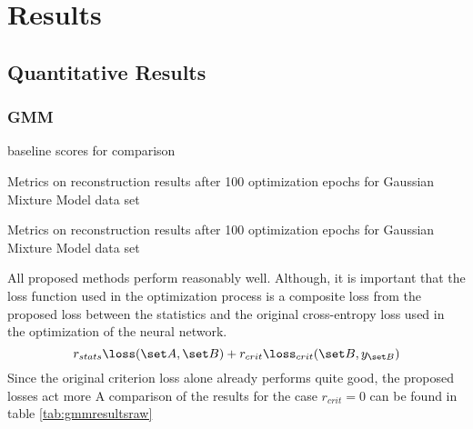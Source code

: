 \section{Results}

\subsection{Quantitative Results}

\subsubsection{GMM}

\begin{table}
\centering
\footnotesize
{}
\caption{baseline scores for comparison}
\label{tab:gmmbaseline}
\end{table}

\begin{table}
\centering
\footnotesize
{}
\caption{Metrics on reconstruction results after 100 optimization epochs for Gaussian Mixture Model data set}
\label{tab:gmmresults}
\end{table}

\begin{table}
\centering
\footnotesize
{}
\caption{Metrics on reconstruction results after 100 optimization epochs for Gaussian Mixture Model data set}
\label{tab:gmmresultsraw}
\end{table}

All proposed methods perform reasonably well. 
Although, it is important that the loss function used in the optimization process
is a composite loss from the proposed loss between the statistics
and the original cross-entropy loss used in the optimization of the neural network.
\[
    r_{stats} \loss(\set A, \set B) + r_{crit}\loss_{crit}(\set B, y_{\set B})
\]
Since the original criterion loss alone already performs quite good, the proposed losses act more
A comparison of the results for the case $r_{crit}=0$ can be found in table \ref{tab:gmmresultsraw}



